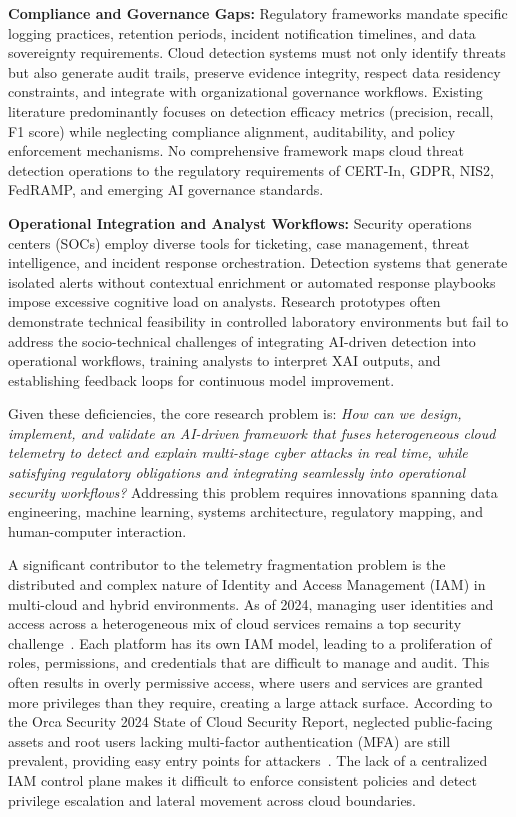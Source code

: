 \textbf{Compliance and Governance Gaps:} Regulatory frameworks mandate specific logging practices, retention periods, incident notification timelines, and data sovereignty requirements. Cloud detection systems must not only identify threats but also generate audit trails, preserve evidence integrity, respect data residency constraints, and integrate with organizational governance workflows. Existing literature predominantly focuses on detection efficacy metrics (precision, recall, F1 score) while neglecting compliance alignment, auditability, and policy enforcement mechanisms. No comprehensive framework maps cloud threat detection operations to the regulatory requirements of CERT-In, GDPR, NIS2, FedRAMP, and emerging AI governance standards.

\textbf{Operational Integration and Analyst Workflows:} Security operations centers (SOCs) employ diverse tools for ticketing, case management, threat intelligence, and incident response orchestration. Detection systems that generate isolated alerts without contextual enrichment or automated response playbooks impose excessive cognitive load on analysts. Research prototypes often demonstrate technical feasibility in controlled laboratory environments but fail to address the socio-technical challenges of integrating AI-driven detection into operational workflows, training analysts to interpret XAI outputs, and establishing feedback loops for continuous model improvement.

Given these deficiencies, the core research problem is: \emph{How can we design, implement, and validate an AI-driven framework that fuses heterogeneous cloud telemetry to detect and explain multi-stage cyber attacks in real time, while satisfying regulatory obligations and integrating seamlessly into operational security workflows?} Addressing this problem requires innovations spanning data engineering, machine learning, systems architecture, regulatory mapping, and human-computer interaction.

A significant contributor to the telemetry fragmentation problem is the distributed and complex nature of Identity and Access Management (IAM) in multi-cloud and hybrid environments. As of 2024, managing user identities and access across a heterogeneous mix of cloud services remains a top security challenge~\cite{fortinet2024cloudreport}. Each platform has its own IAM model, leading to a proliferation of roles, permissions, and credentials that are difficult to manage and audit. This often results in overly permissive access, where users and services are granted more privileges than they require, creating a large attack surface. According to the Orca Security 2024 State of Cloud Security Report, neglected public-facing assets and root users lacking multi-factor authentication (MFA) are still prevalent, providing easy entry points for attackers~\cite{orca2024cloudreport}. The lack of a centralized IAM control plane makes it difficult to enforce consistent policies and detect privilege escalation and lateral movement across cloud boundaries.

